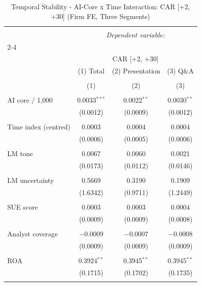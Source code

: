
\begin{table}[!htbp] \centering 
  \caption{Temporal Stability - AI-Core x Time Interaction: CAR [+2, +30] (Firm FE, Three Segments)} 
  \label{} 
\begin{tabular}{@{\extracolsep{5pt}}lccc} 
\\[-1.8ex]\hline 
\hline \\[-1.8ex] 
 & \multicolumn{3}{c}{\textit{Dependent variable:}} \\ 
\cline{2-4} 
\\[-1.8ex] & \multicolumn{3}{c}{CAR [+2, +30]} \\ 
 & (1) Total & (2) Presentation & (3) Q\&A \\ 
\\[-1.8ex] & (1) & (2) & (3)\\ 
\hline \\[-1.8ex] 
 AI core / 1,000 & 0.0033$^{***}$ & 0.0022$^{**}$ & 0.0030$^{**}$ \\ 
  & (0.0012) & (0.0009) & (0.0012) \\ 
  & & & \\ 
 Time index (centred) & 0.0003 & 0.0004 & 0.0004 \\ 
  & (0.0006) & (0.0005) & (0.0006) \\ 
  & & & \\ 
 LM tone & 0.0067 & 0.0060 & 0.0021 \\ 
  & (0.0173) & (0.0112) & (0.0146) \\ 
  & & & \\ 
 LM uncertainty & 0.5669 & 0.3190 & 0.1909 \\ 
  & (1.6342) & (0.9711) & (1.2449) \\ 
  & & & \\ 
 SUE score & 0.0003 & 0.0003 & 0.0004 \\ 
  & (0.0009) & (0.0009) & (0.0008) \\ 
  & & & \\ 
 Analyst coverage & $-$0.0009 & $-$0.0007 & $-$0.0008 \\ 
  & (0.0009) & (0.0009) & (0.0009) \\ 
  & & & \\ 
 ROA & 0.3924$^{**}$ & 0.3945$^{**}$ & 0.3945$^{**}$ \\ 
  & (0.1715) & (0.1702) & (0.1735) \\ 
  & & & \\ 

\end{tabular}
\end{table}
